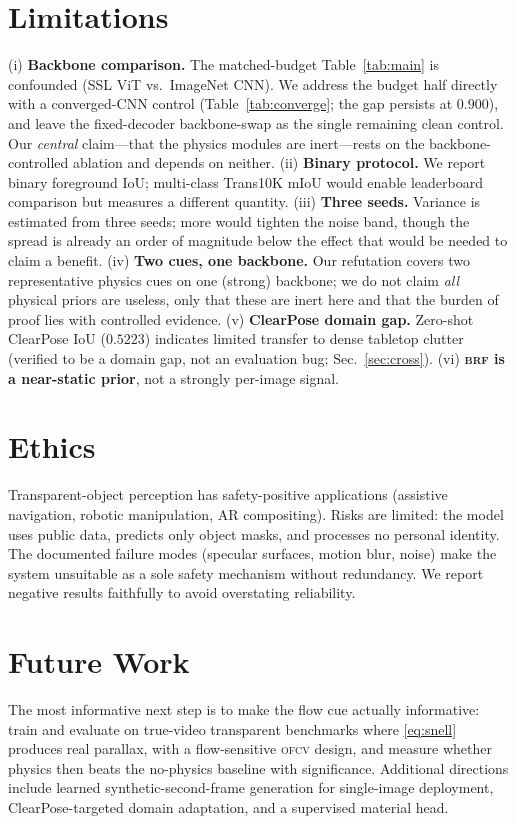 \documentclass{article}
\newcommand{\ofcv}{\textsc{ofcv}}
\newcommand{\brf}{\textsc{brf}}
\newcommand{\iou}{IoU}
\begin{document}
\section{Limitations}
(i) \textbf{Backbone comparison.} The matched-budget Table~\ref{tab:main} is
confounded (SSL ViT vs.\ ImageNet CNN). We address the budget half directly with
a converged-CNN control (Table~\ref{tab:converge}; the gap persists at $0.900$),
and leave the fixed-decoder backbone-swap as the single remaining clean control.
Our \emph{central} claim---that the physics modules are inert---rests on the
backbone-controlled ablation and depends on neither.
(ii) \textbf{Binary protocol.} We report binary foreground \iou; multi-class
Trans10K mIoU would enable leaderboard comparison but measures a different
quantity. (iii) \textbf{Three seeds.} Variance is estimated from three seeds;
more would tighten the noise band, though the spread is already an order of
magnitude below the effect that would be needed to claim a benefit.
(iv) \textbf{Two cues, one backbone.} Our refutation covers two representative
physics cues on one (strong) backbone; we do not claim \emph{all} physical
priors are useless, only that these are inert here and that the burden of proof
lies with controlled evidence. (v) \textbf{ClearPose domain gap.} Zero-shot
ClearPose \iou{} ($0.5223$) indicates limited transfer to dense tabletop
clutter (verified to be a domain gap, not an evaluation bug; Sec.~\ref{sec:cross}).
(vi) \textbf{\brf{} is a near-static prior}, not a strongly per-image signal.

\section{Ethics}
Transparent-object perception has safety-positive applications (assistive
navigation, robotic manipulation, AR compositing). Risks are limited: the model
uses public data, predicts only object masks, and processes no personal
identity. The documented failure modes (specular surfaces, motion blur, noise)
make the system unsuitable as a sole safety mechanism without redundancy. We
report negative results faithfully to avoid overstating reliability.

\section{Future Work}
The most informative next step is to make the flow cue actually informative:
train and evaluate on true-video transparent benchmarks where \eqref{eq:snell}
produces real parallax, with a flow-sensitive \ofcv{} design, and measure
whether physics then beats the no-physics baseline with significance. Additional
directions include learned synthetic-second-frame generation for single-image
deployment, ClearPose-targeted domain adaptation, and a supervised material head.
\end{document}
